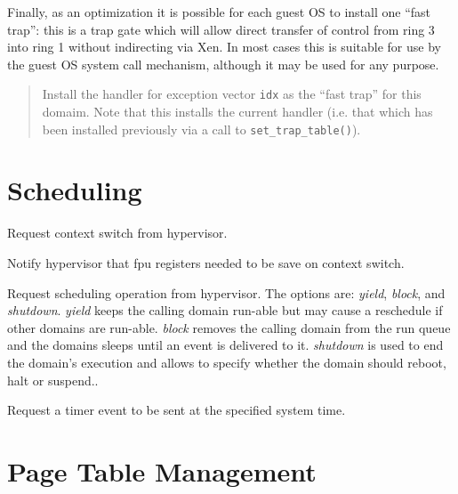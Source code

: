 \documentclass[11pt,twoside,final,openright]{xenstyle}
\begin{document}
Finally, as an optimization it is possible for each guest OS 
to install one ``fast trap'': this is a trap gate which will 
allow direct transfer of control from ring 3 into ring 1 without
indirecting via Xen. In most cases this is suitable for use by 
the guest OS system call mechanism, although it may be used for
any purpose. 


\begin{quote}

Install the handler for exception vector {\tt idx} as the ``fast
trap'' for this domaim. Note that this installs the current handler 
(i.e. that which has been installed previously via a call 
to {\tt set\_trap\_table()}). 

\end{quote}



\section{Scheduling} 



Request context switch from hypervisor.



Notify hypervisor that fpu registers needed to be save on context switch.



Request scheduling operation from hypervisor. The options are: {\it
yield}, {\it block}, and {\it shutdown}.  {\it yield} keeps the
calling domain run-able but may cause a reschedule if other domains
are run-able.  {\it block} removes the calling domain from the run
queue and the domains sleeps until an event is delivered to it.  {\it
shutdown} is used to end the domain's execution and allows to specify
whether the domain should reboot, halt or suspend..


Request a timer event to be sent at the specified system time.


\section{Page Table Management} 

\end{document}
